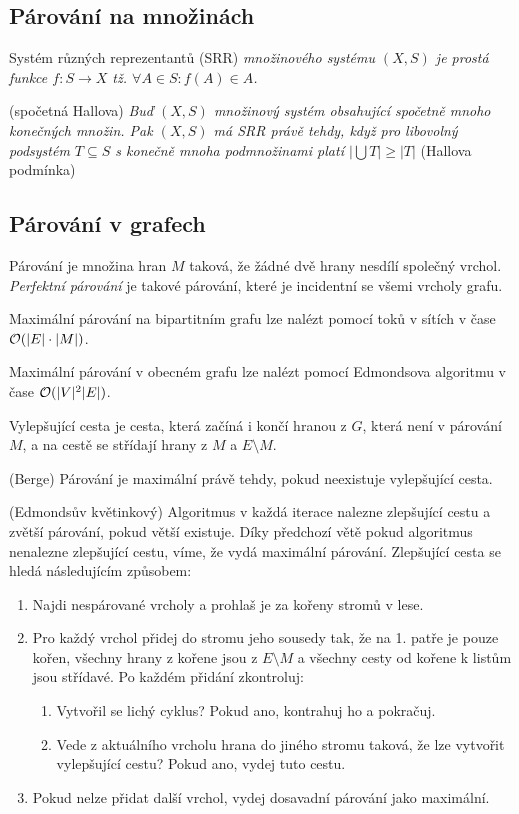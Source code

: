 \subsection{Párování na množinách}

\df Systém různých reprezentantů (SRR) {\it množinového systému $(X,S)$ je
prostá funkce $f:S\rightarrow X$ tž. $\forall A \in S: f(A) \in A$.}

\vt (spočetná Hallova) {\it Buď $(X,S)$ množinový systém obsahující spočetně mnoho konečných množin. Pak $(X,S)$ má SRR právě tehdy, když pro libovolný podsystém $T \subseteq S$ s konečně mnoha podmnožinami platí $|\bigcup T| \ge |T|$} (Hallova podmínka)


\subsection{Párování v grafech}

\df Párování je množina hran $M$ taková, že žádné dvě hrany nesdílí společný
vrchol. {\it Perfektní párování} je takové párování, které je incidentní se
všemi vrcholy grafu.

\tv Maximální párování na bipartitním grafu lze nalézt pomocí toků v sítích v
čase $\mathcal{O}(|E| \cdot |M|)$.

\vt Maximální párování v obecném grafu lze nalézt pomocí Edmondsova algoritmu v
čase $\mathcal{O}(|V|^2|E|)$.

\df Vylepšující cesta je cesta, která začíná i končí hranou z $G$, která není v
párování $M$, a na cestě se střídají hrany z $M$ a $E\setminus M$.

\vt (Berge) Párování je maximální právě tehdy, pokud neexistuje vylepšující
cesta.

\alg (Edmondsův květinkový) Algoritmus v každá iterace nalezne zlepšující cestu
a zvětší párování, pokud větší existuje. Díky předchozí větě pokud algoritmus
nenalezne zlepšující cestu, víme, že vydá maximální párování. Zlepšující cesta
se hledá následujícím způsobem:

\begin{enumerate}
	\item Najdi nespárované vrcholy a prohlaš je za kořeny stromů v lese.
	\item Pro každý vrchol přidej do stromu jeho sousedy tak, že na 1. patře je
	pouze kořen, všechny hrany z kořene jsou z $E \setminus M$ a všechny cesty
	od kořene k listům jsou střídavé. Po každém přidání zkontroluj:
	\begin{enumerate}
		\item Vytvořil se lichý cyklus? Pokud ano, kontrahuj ho a pokračuj.
		\item Vede z aktuálního vrcholu hrana do jiného stromu taková, že lze
		vytvořit vylepšující cestu? Pokud ano, vydej tuto cestu.
	\end{enumerate}
	\item Pokud nelze přidat další vrchol, vydej dosavadní párování jako
	maximální.
\end{enumerate}

